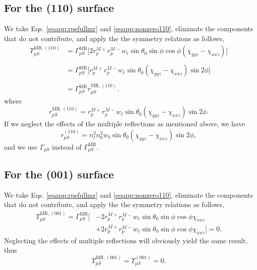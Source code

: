 \subsection{For the (110) surface}

We take Eqs. \eqref{eqapp:rpsfullmr} and \eqref{eqapp:nonzero110}, eliminate the
components that do not contribute, and apply the the symmetry relations as
follows,
\begin{equation*}
\begin{split}
\Upsilon^{\mathrm{MR},(110)}_{pS} &= 
\Gamma^{\mathrm{MR}}_{pS}
\big[
2r^{M+}_{p}r^{M-}_{p}w_{\ell}\sin\theta_{0}\sin\phi\cos\phi
(\chi_{yyz} - \chi_{xxz})
\big]\\\\\
&= 
\Gamma^{\mathrm{MR}}_{pS}
\big[
r^{M+}_{p}r^{M-}_{p}w_{\ell}\sin\theta_{0}(\chi_{yyz} - \chi_{xxz})\sin2\phi
\big]\\\\
&= 
\Gamma^{\mathrm{MR}}_{pS}r^{\mathrm{MR},(110)}_{pS}.
\end{split}
\end{equation*}
where
\begin{equation}\label{eqapp:final-rps.mr.110}
r^{\mathrm{MR},(110)}_{pS} =
r^{M+}_{p}r^{M-}_{p}w_{\ell}\sin\theta_{0}(\chi_{yyz} - \chi_{xxz})\sin2\phi.
\end{equation}
If we neglect the effects of the multiple reflections as mentioned above, we
have
\begin{equation}\label{eqapp:final-rps.110}
r^{(110)}_{pS} = 
n^{2}_{\ell}n^{2}_{b}w_{b}\sin\theta_{0}(\chi_{yyz} - \chi_{xxz})\sin2\phi,
\end{equation}
and we use $\Gamma_{pS}$ instead of $\Gamma^{\mathrm{MR}}_{pS}$.


\subsection{For the (001) surface}

We take Eqs. \eqref{eqapp:rpsfullmr} and \eqref{eqapp:nonzero110}, eliminate the
components that do not contribute, and apply the the symmetry relations as
follows,
\begin{equation*}
\begin{split}
\Upsilon^{\mathrm{MR},(001)}_{pS}
= 
\Gamma^{\mathrm{MR}}_{pS}
\big[
&- 2r^{M+}_{p}r^{M-}_{p}w_{\ell}\sin\theta_{0}\sin\phi\cos\phi\chi_{xxz}\\
&+ 2r^{M+}_{p}r^{M-}_{p}w_{\ell}\sin\theta_{0}\sin\phi\cos\phi\chi_{xxz}
\big] = 0.
\end{split}
\end{equation*}
Neglecting the effects of multiple reflections will obviously yield the same
result, thus
\begin{equation}\label{eqapp:final-rps.mr.001}
\Upsilon^{\mathrm{MR},(001)}_{pS} = \Upsilon^{(001)}_{pS} = 0.
\end{equation}


